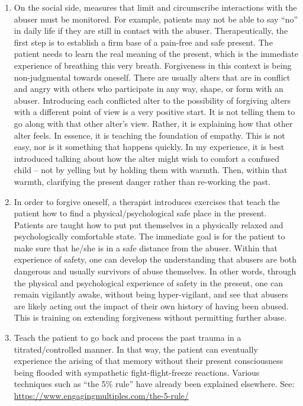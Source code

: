 \documentclass[]{book}
\begin{document}
\begin{enumerate}
\def\labelenumi{\arabic{enumi}.}
\item
  On the social side, measures that limit and circumscribe interactions with the abuser must be monitored. For example, patients may not be able to say ``no'' in daily life if they are still in contact with the abuser. Therapeutically, the first step is to establish a firm base of a pain-free and safe present. The patient needs to learn the real meaning of the present, which is the immediate experience of breathing this very breath. Forgiveness in this context is being non-judgmental towards oneself. There are usually alters that are in conflict and angry with others who participate in any way, shape, or form with an abuser. Introducing each conflicted alter to the possibility of forgiving alters with a different point of view is a very positive start. It is not telling them to go along with that other alter's view. Rather, it is explaining how that other alter feels. In essence, it is teaching the foundation of empathy. This is not easy, nor is it something that happens quickly. In my experience, it is best introduced talking about how the alter might wish to comfort a confused child -- not by yelling but by holding them with warmth. Then, within that warmth, clarifying the present danger rather than re-working the past.
\item
  In order to forgive oneself, a therapist introduces exercises that teach the patient how to find a physical/psychological safe place in the present. Patients are taught how to put put themselves in a physically relaxed and psychologically comfortable state. The immediate goal is for the patient to make sure that he/she is in a safe distance from the abuser. Within that experience of safety, one can develop the understanding that abusers are both dangerous and usually survivors of abuse themselves. In other words, through the physical and psychological experience of safety in the present, one can remain vigilantly awake, without being hyper-vigilant, and see that abusers are likely acting out the impact of their own history of having been abused. This is training on extending forgiveness without permitting further abuse.
\item
  Teach the patient to go back and process the past trauma in a titrated/controlled manner. In that way, the patient can eventually experience the arising of that memory without their present consciousness being flooded with sympathetic fight-flight-freeze reactions. Various techniques such as ``the 5\% rule'' have already been explained elsewhere. See: \url{https://www.engagingmultiples.com/the-5-rule/}

\end{enumerate}
\end{document}

